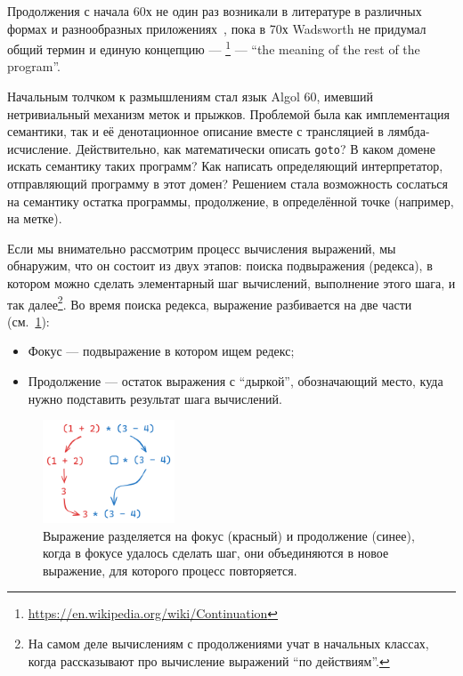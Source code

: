 
Продолжения с начала 60х не один раз возникали в литературе в различных формах и разнообразных приложениях~\cite{reynolds1993discoveries, landin1997histories}, пока в 70х Wadsworth не придумал общий термин и единую концепцию --- \footnote{\url{https://en.wikipedia.org/wiki/Continuation}} --- ``the meaning of the rest of the program''.

Начальным толчком к размышлениям стал язык Algol 60, имевший нетривиальный механизм меток и прыжков.
Проблемой была как имплементация семантики, так и её денотационное описание вместе с трансляцией в лямбда-исчисление.
Действительно, как математически описать \texttt{goto}?
В каком домене искать семантику таких программ?
Как написать определяющий интерпретатор, отправляющий программу в этот домен?
Решением стала возможность сослаться на семантику остатка программы, продолжение, в определённой точке (например, на метке).

Если мы внимательно рассмотрим процесс вычисления выражений, мы обнаружим, что он состоит из двух этапов: поиска подвыражения (редекса), в котором можно сделать элементарный шаг вычислений, выполнение этого шага, и так далее\footnote{На самом деле вычислениям с продолжениями учат в начальных классах, когда рассказывают про вычисление выражений ``по действиям''.}.
Во время поиска редекса, выражение разбивается на две части (см.~\ref{fig:basic-continuation}):
\begin{itemize}
    \item Фокус --- подвыражение в котором ищем редекс;
    \item Продолжение --- остаток выражения с ``дыркой'', обозначающий место, куда нужно подставить результат шага вычислений.
\end{itemize}

\begin{figure}[h]
    \centering
    \includegraphics[width=0.35\textwidth]{figs/cont-expr}
    \caption{Выражение разделяется на фокус (красный) и продолжение (синее), когда в фокусе удалось сделать шаг, они объединяются в новое выражение, для которого процесс повторяется.}
    \label{fig:basic-continuation}
\end{figure}

